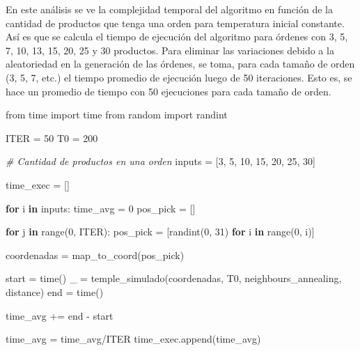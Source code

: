 \documentclass[
]{article}
\newenvironment{Shaded}{}{}
\newcommand{\BuiltInTok}[1]{#1}
\newcommand{\CommentTok}[1]{\textcolor[rgb]{0.38,0.63,0.69}{\textit{#1}}}
\newcommand{\ControlFlowTok}[1]{\textcolor[rgb]{0.00,0.44,0.13}{\textbf{#1}}}
\newcommand{\DecValTok}[1]{\textcolor[rgb]{0.25,0.63,0.44}{#1}}
\newcommand{\ImportTok}[1]{#1}
\newcommand{\KeywordTok}[1]{\textcolor[rgb]{0.00,0.44,0.13}{\textbf{#1}}}
\newcommand{\NormalTok}[1]{#1}
\newcommand{\OperatorTok}[1]{\textcolor[rgb]{0.40,0.40,0.40}{#1}}
\begin{document}
En este análisis se ve la complejidad temporal del algoritmo en función
de la cantidad de productos que tenga una orden para temperatura inicial
constante. Así es que se calcula el tiempo de ejecución del algoritmo
para órdenes con 3, 5, 7, 10, 13, 15, 20, 25 y 30 productos. Para
eliminar las variaciones debido a la aleatoriedad en la generación de
las órdenes, se toma, para cada tamaño de orden (3, 5, 7, etc.) el
tiempo promedio de ejecución luego de 50 iteraciones. Esto es, se hace
un promedio de tiempo con 50 ejecuciones para cada tamaño de orden.

\begin{Shaded}
\begin{Highlighting}[]
\ImportTok{from}\NormalTok{ time }\ImportTok{import}\NormalTok{ time}
\ImportTok{from}\NormalTok{ random }\ImportTok{import}\NormalTok{ randint}
\end{Highlighting}
\end{Shaded}

\begin{Shaded}
\begin{Highlighting}[]
\NormalTok{ITER }\OperatorTok{=} \DecValTok{50}
\NormalTok{T0 }\OperatorTok{=} \DecValTok{200}

\CommentTok{# Cantidad de productos en una orden}
\NormalTok{inputs }\OperatorTok{=}\NormalTok{ [}\DecValTok{3}\NormalTok{, }\DecValTok{5}\NormalTok{, }\DecValTok{10}\NormalTok{, }\DecValTok{15}\NormalTok{, }\DecValTok{20}\NormalTok{, }\DecValTok{25}\NormalTok{, }\DecValTok{30}\NormalTok{]}

\NormalTok{time_exec }\OperatorTok{=}\NormalTok{ []}

\ControlFlowTok{for}\NormalTok{ i }\KeywordTok{in}\NormalTok{ inputs:}
\NormalTok{    time_avg }\OperatorTok{=} \DecValTok{0}
\NormalTok{    pos_pick }\OperatorTok{=}\NormalTok{ []}

    \ControlFlowTok{for}\NormalTok{ j }\KeywordTok{in} \BuiltInTok{range}\NormalTok{(}\DecValTok{0}\NormalTok{, ITER):}
\NormalTok{        pos_pick }\OperatorTok{=}\NormalTok{ [randint(}\DecValTok{0}\NormalTok{, }\DecValTok{31}\NormalTok{) }\ControlFlowTok{for}\NormalTok{ i }\KeywordTok{in} \BuiltInTok{range}\NormalTok{(}\DecValTok{0}\NormalTok{, i)]}

\NormalTok{        coordenadas }\OperatorTok{=}\NormalTok{ map_to_coord(pos_pick)}

\NormalTok{        start }\OperatorTok{=}\NormalTok{ time()}
\NormalTok{        _ }\OperatorTok{=}\NormalTok{ temple_simulado(coordenadas, T0, neighbours_annealing, distance)}
\NormalTok{        end }\OperatorTok{=}\NormalTok{ time()}

\NormalTok{        time_avg }\OperatorTok{+=}\NormalTok{ end }\OperatorTok{-}\NormalTok{ start}

\NormalTok{    time_avg }\OperatorTok{=}\NormalTok{ time_avg}\OperatorTok{/}\NormalTok{ITER}
\NormalTok{    time_exec.append(time_avg)}
\end{Highlighting}
\end{Shaded}
\end{document}
